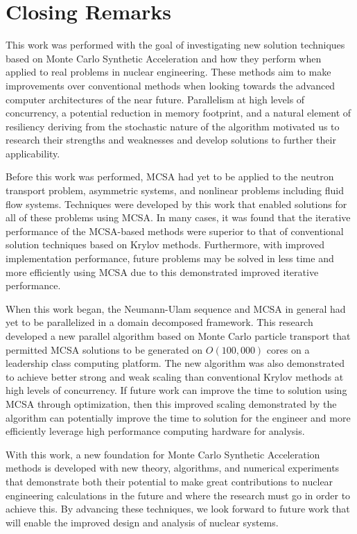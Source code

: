 \section{Closing Remarks\ }
\label{sec:closing}

This work was performed with the goal of investigating new solution
techniques based on Monte Carlo Synthetic Acceleration and how they
perform when applied to real problems in nuclear engineering. These
methods aim to make improvements over conventional methods when
looking towards the advanced computer architectures of the near
future. Parallelism at high levels of concurrency, a potential
reduction in memory footprint, and a natural element of resiliency
deriving from the stochastic nature of the algorithm motivated us to
research their strengths and weaknesses and develop solutions to
further their applicability.

Before this work was performed, MCSA had yet to be applied to the
neutron transport problem, asymmetric systems, and nonlinear problems
including fluid flow systems. Techniques were developed by this work
that enabled solutions for all of these problems using MCSA. In many
cases, it was found that the iterative performance of the MCSA-based
methods were superior to that of conventional solution techniques
based on Krylov methods. Furthermore, with improved implementation
performance, future problems may be solved in less time and more
efficiently using MCSA due to this demonstrated improved iterative
performance.

When this work began, the Neumann-Ulam sequence and MCSA in general
had yet to be parallelized in a domain decomposed framework. This
research developed a new parallel algorithm based on Monte Carlo
particle transport that permitted MCSA solutions to be generated on
$O(100,000)$ cores on a leadership class computing platform. The new
algorithm was also demonstrated to achieve better strong and weak
scaling than conventional Krylov methods at high levels of
concurrency. If future work can improve the time to solution using
MCSA through optimization, then this improved scaling demonstrated by
the algorithm can potentially improve the time to solution for the
engineer and more efficiently leverage high performance computing
hardware for analysis.

With this work, a new foundation for Monte Carlo Synthetic
Acceleration methods is developed with new theory, algorithms, and
numerical experiments that demonstrate both their potential to make
great contributions to nuclear engineering calculations in the future
and where the research must go in order to achieve this. By advancing
these techniques, we look forward to future work that will enable the
improved design and analysis of nuclear systems.
